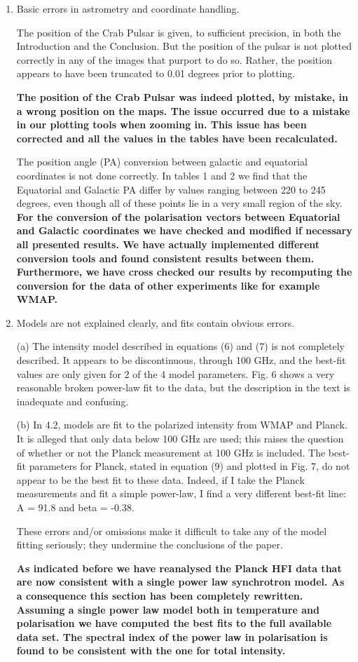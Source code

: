 \documentclass[12pt]{article}
\begin{document}
\begin{enumerate}
\item  Basic errors in astrometry and coordinate handling.

The position of the Crab Pulsar is given, to sufficient precision, in
both the Introduction and the Conclusion. But the position of the
pulsar is not plotted correctly in any of the images that purport to
do so. Rather, the position appears to have been truncated to 0.01
degrees prior to plotting.

\textbf{The position of the Crab Pulsar was indeed plotted, by mistake, in a wrong position on the maps. The issue occurred due to a mistake in our plotting tools when zooming in. This issue has been corrected and all the values in the tables have been recalculated.} 

The position angle (PA) conversion between galactic and equatorial
coordinates is not done correctly. In tables 1 and 2 we find that the
Equatorial and Galactic PA differ by values ranging between 220 to 245
degrees, even though all of these points lie in a very small region of
the sky.
{\bf
For the conversion of the polarisation vectors between Equatorial and Galactic coordinates we have checked and modified if necessary all presented results. We have actually implemented different conversion tools and found consistent results between them. Furthermore, we have cross checked our results by recomputing the conversion for the data of other experiments like for example WMAP.}

\item Models are not explained clearly, and fits contain obvious errors.

(a) The intensity model described in equations (6) and (7) is not
completely described. It appears to be discontinuous, through 100
GHz, and the best-fit values are only given for 2 of the 4 model
parameters. Fig. 6 shows a very reasonable broken power-law fit to
the data, but the description in the text is inadequate and confusing.

(b) In 4.2, models are fit to the polarized intensity from WMAP and
Planck. It is alleged that only data below 100 GHz are used; this
raises the question of whether or not the Planck measurement at 100
GHz is included. The best-fit parameters for Planck, stated in
equation (9) and plotted in Fig. 7, do not appear to be the best fit
to these data. Indeed, if I take the Planck measurements and fit a
simple power-law, I find a very different best-fit line: A = 91.8 and
beta = -0.38.

These errors and/or omissions make it difficult to take any of the
model fitting seriously; they undermine the conclusions of the paper.

\textbf{As indicated before we have reanalysed the Planck HFI data that are now consistent with a single power law synchrotron model. As a consequence this section has been completely rewritten. Assuming a single power law model both in temperature and polarisation we have computed the best fits to the full available data set. The spectral index of the power law in polarisation is found to be consistent with the one for total intensity.}

\end{enumerate}
\end{document}
